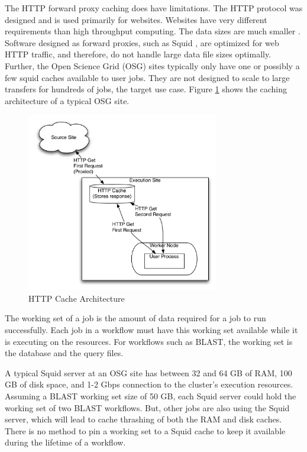 The HTTP forward proxy caching does have limitations.  The HTTP protocol was designed and is used primarily for websites.  Websites have very different requirements than high throughput computing.  The data sizes are much smaller \cite{websitesize}.  Software designed as forward proxies, such as Squid \cite{squidcacheurl}, are optimized for web HTTP traffic, and therefore, do not handle large data file sizes optimally.  Further, the Open Science Grid (OSG) \cite{pordes2007open} sites typically only have one or possibly a few squid caches available to user jobs.  They are not designed to scale to large transfers for hundreds of jobs, the target use case.  Figure \ref{fig:httpcachearchitecture} shows the caching architecture of a typical OSG site.

\begin{figure}[ht]
	\centering
	\includegraphics[width=0.75\textwidth]{images/HTTPCache.pdf}
	\caption{HTTP Cache Architecture}
	\label{fig:httpcachearchitecture}
\end{figure}

The working set of a job is the amount of data required for a job to run successfully.  Each job in a workflow must have this working set available while it is executing on the resources.  For workflows such as BLAST, the working set is the database and the query files.  

A typical Squid server at an OSG site has between 32 and 64 GB of RAM, 100 GB of disk space, and 1-2 Gbps connection to the cluster's execution resources.  Assuming a BLAST working set size of 50 GB, each Squid server could hold the working set of two BLAST workflows.  But, other jobs are also using the Squid server, which will lead to cache thrashing of both the RAM and disk caches.  There is no method to pin a working set to a Squid cache to keep it available during the lifetime of a workflow.



